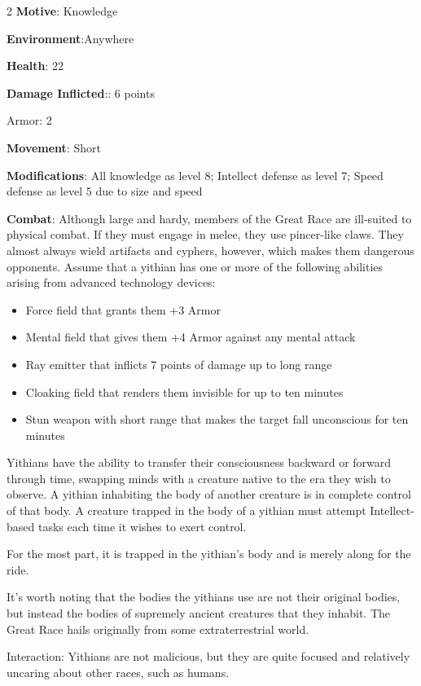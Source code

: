 \begin{multicols}{2}
\textbf{Motive}: Knowledge 

\textbf{Environment}:Anywhere 

\textbf{Health}: 22

\textbf{Damage Inflicted}:: 6 points 

Armor: 2

\textbf{Movement}: Short

\textbf{Modifications}: All knowledge as level 8; Intellect defense as level 7; Speed defense as level 5 due to size and speed 

\textbf{Combat}: Although large and hardy, members of the Great Race are ill-suited to physical combat. If they must engage in melee, they use pincer-like claws. They almost always wield artifacts and cyphers, however, which makes them dangerous opponents. Assume that a yithian has one or more of the following abilities arising from advanced technology devices:

\begin{itemize}
\item Force field that grants them +3 Armor
\item Mental field that gives them +4 Armor against any mental attack
\item Ray emitter that inflicts 7 points of damage up to long range
\item Cloaking field that renders them invisible for up to ten minutes
\item Stun weapon with short range that makes the target fall unconscious for ten minutes
\end{itemize}

Yithians have the ability to transfer their consciousness backward or forward through time, swapping minds with a creature native to the era they wish to observe. A yithian inhabiting the body of another creature is in complete control of that body. A creature trapped in the body of a yithian must attempt Intellect-based tasks each time it wishes to exert control.

For the most part, it is trapped in the yithian’s body and is merely along for the ride.

It’s worth noting that the bodies the yithians use are not their original bodies, but instead the bodies of supremely ancient creatures that they inhabit. The Great Race hails originally from some extraterrestrial world.

Interaction: Yithians are not malicious, but they are quite focused and relatively uncaring about other races, such as humans.


\end{multicols}
